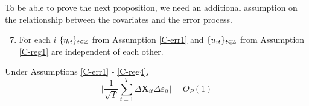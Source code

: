 \documentclass[a4paper,12pt]{article}
\begin{document}
To be able to prove the next proposition, we need an additional assumption on the relationship between the covariates and the error process.

\begin{enumerate}[label=(C\arabic*),leftmargin=1.05cm]
\setcounter{enumi}{6}
\item \label{C-reg4} For each $i$ $\{\eta_{it}\}_{t\in\mathbb{Z}}$ from Assumption \ref{C-err1} and $\{u_{it}\}_{t\in\mathbb{Z}}$ from Assumption \ref{C-reg1} are independent of each other.
\end{enumerate}


\begin{prop}\label{prop-reg-2}
Under Assumptions \ref{C-err1} - \ref{C-reg4},
\[ \Big| \frac{1}{\sqrt{T}}\sum_{t=1}^T \Delta \mathbf{X}_{it}\Delta \varepsilon_{it} \Big| = O_P(1)
\]
\end{prop}
\end{document}
